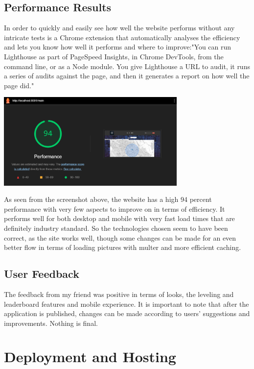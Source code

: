 \documentclass[12pt,a4paper]{report}
\begin{document}
\section{Performance Results}

In order to quickly and easily see how well the website performs without any intricate tests is a Chrome extension that automatically analyses the efficiency and lets you know how well it performs and where to improve:"You can run Lighthouse as part of PageSpeed Insights, in Chrome DevTools, from the command line, or as a Node module. You give Lighthouse a URL to audit, it runs a series of audits against the page, and then it generates a report on how well the page did."~\cite{lighthouseChrome}

\begin{center}
\includegraphics[width=0.7\textwidth]{images/lighthouse.png}
\end{center}

As seen from the screenshot above, the website has a high 94 percent performance with very few aspects to improve on in terms of efficiency. It performs well for both desktop and mobile with very fast load times that are definitely industry standard. So the technologies chosen seem to have been correct, as the site works well, though some changes can be made for an even better flow in terms of loading pictures with multer and more efficient caching.

\section{User Feedback}

The feedback from my friend was positive in terms of looks, the leveling and leaderboard features and mobile experience. It is important to note that after the application is published, changes can be made according to users' suggestions and improvements. Nothing is final.

\chapter{Deployment and Hosting}
\end{document}
